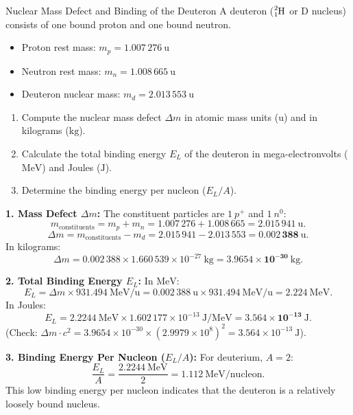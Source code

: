 \begin{exercise}{Nuclear Mass Defect and Binding of the Deuteron}
A deuteron ($\ce{^{2}_{1}H}$ or $\mathrm{D}$ nucleus) consists of one bound proton and one bound neutron.
\begin{itemize}[itemsep=1pt]
  \item Proton rest mass: $m_p = 1.007\,276\ \mathrm{u}$
  \item Neutron rest mass: $m_n = 1.008\,665\ \mathrm{u}$
  \item Deuteron nuclear mass: $m_d = 2.013\,553\ \mathrm{u}$
\end{itemize}
\begin{enumerate}[leftmargin=1.5em,itemsep=2pt]
  \item Compute the nuclear mass defect $\Delta m$ in atomic mass units ($\mathrm{u}$) and in kilograms ($\mathrm{kg}$).
  \item Calculate the total binding energy $E_L$ of the deuteron in mega-electronvolts ($\mathrm{MeV}$) and Joules ($\mathrm{J}$).
  \item Determine the binding energy per nucleon ($E_L/A$).
\end{enumerate}
\end{exercise}

\begin{tabletworkspace}[5.0cm]
\end{tabletworkspace}

\begin{solution}
\textbf{1. Mass Defect $\Delta m$:}
The constituent particles are $1\ p^+$ and $1\ n^0$:
\[
m_{\text{constituents}} = m_p + m_n = 1.007\,276 + 1.008\,665 = 2.015\,941\ \mathrm{u}.
\]
\[
\Delta m = m_{\text{constituents}} - m_d = 2.015\,941 - 2.013\,553 = \mathbf{0.002\,388\ \mathrm{u}}.
\]
In kilograms:
\[
\Delta m = 0.002\,388 \times 1.660\,539 \times 10^{-27}\ \mathrm{kg} = \mathbf{3.9654 \times 10^{-30}\ \mathrm{kg}}.
\]

\textbf{2. Total Binding Energy $E_L$:}
In $\mathrm{MeV}$:
\[
E_L = \Delta m \times 931.494\ \mathrm{MeV/u} = 0.002\,388\ \mathrm{u} \times 931.494\ \mathrm{MeV/u} = \mathbf{2.224\ \mathrm{MeV}}.
\]
In Joules:
\[
E_L = 2.2244\ \mathrm{MeV} \times 1.602\,177 \times 10^{-13}\ \mathrm{J/MeV} = \mathbf{3.564 \times 10^{-13}\ \mathrm{J}}.
\]
(Check: $\Delta m \cdot c^2 = 3.9654 \times 10^{-30} \times (2.9979 \times 10^8)^2 = 3.564 \times 10^{-13}\ \mathrm{J}$).

\textbf{3. Binding Energy Per Nucleon ($E_L/A$):}
For deuterium, $A = 2$:
\[
\frac{E_L}{A} = \frac{2.2244\ \mathrm{MeV}}{2} = \mathbf{1.112\ \mathrm{MeV/nucleon}}.
\]
This low binding energy per nucleon indicates that the deuteron is a relatively loosely bound nucleus.
\end{solution}

